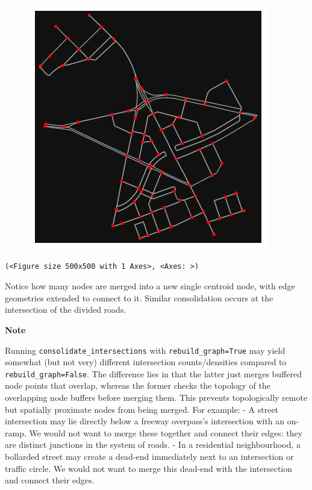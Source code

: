 \documentclass[
  letterpaper,
  DIV=11,
  numbers=noendperiod]{scrreprt}
\begin{document}
\begin{figure}[H]

{\centering \includegraphics{labs/w07_OSM_files/figure-pdf/cell-20-output-1.png}

}

\end{figure}

\begin{verbatim}
(<Figure size 500x500 with 1 Axes>, <Axes: >)
\end{verbatim}

Notice how many nodes are merged into a new single centroid node, with
edge geometries extended to connect to it. Similar consolidation occurs
at the intersection of the divided roads.

\textbf{Note}

Running \texttt{consolidate\_intersections} with
\texttt{rebuild\_graph=True} may yield somewhat (but not very) different
intersection counts/densities compared to \texttt{rebuild\_graph=False}.
The difference lies in that the latter just merges buffered node points
that overlap, whereas the former checks the topology of the overlapping
node buffers before merging them. This prevents topologically remote but
spatially proximate nodes from being merged. For example: - A street
intersection may lie directly below a freeway overpass's intersection
with an on-ramp. We would not want to merge these together and connect
their edges: they are distinct junctions in the system of roads. - In a
residential neighbourhood, a bollarded street may create a dead-end
immediately next to an intersection or traffic circle. We would not want
to merge this dead-end with the intersection and connect their edges.
\end{document}
